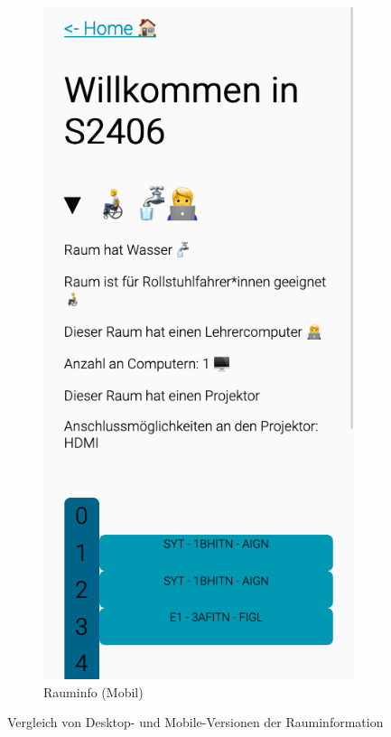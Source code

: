\begin{figure}[H]
\begin{subfigure}[c]{0.34\textwidth}
        \includegraphics[width=\textwidth]{media/ResponsiveDesign/ZeliaMobile.png}
        \caption{Rauminfo (Mobil)}
    \end{subfigure}
    \caption{Vergleich von Desktop- und Mobile-Versionen der Rauminformation}
    \label{fig:info}
\end{figure}


